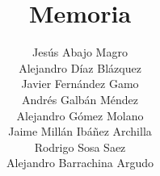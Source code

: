 

\documentclass[12pt]{article}
\usepackage[a4paper, margin=1in, headheight=14pt]{geometry}
\usepackage[utf8]{inputenc}
\usepackage[spanish]{babel}
\usepackage{tabularx}
\usepackage{graphicx}
\usepackage{float}
\usepackage{setspace}
\usepackage{anyfontsize}
\usepackage[toc,page]{appendix} %
\usepackage{hyperref}
\usepackage[table]{xcolor}
\usepackage{fancyhdr}
\usepackage{nameref}
\usepackage{datetime}
\usepackage{tikz}
\usepackage[11pt]{moresize}
\usepackage{enumerate}
\usepackage{etoolbox}


\usetikzlibrary{calc}
\newcommand\HRule{\rule{\textwidth}{1pt}}


\pagestyle{fancy}
\fancyhf{}
\fancyhead[RE,LO]{\nombredelproyecto}
\fancyfoot[CE,CO]{\leftmark}
\fancyfoot[LE,RO]{\thepage}

\renewcommand{\headrulewidth}{2pt}
\renewcommand{\footrulewidth}{1pt}



\newcommand{\nombredelproyecto}{\textbf{Memoria}}
\setcounter{secnumdepth}{4}
\makeatletter
\renewcommand{\paragraph}{\@startsection{paragraph}{4}{0ex}%
    {-3.25ex plus -1ex minus -0.2ex}%
    {1.5ex plus 0.2ex}%
    {\normalfont\normalsize\bfseries}}
\makeatother

\title{\nombredelproyecto} 
\author{Jesús Abajo Magro \\
Alejandro Díaz Blázquez \\
Javier Fernández Gamo \\
Andrés Galbán Méndez \\
Alejandro Gómez Molano \\
Jaime Millán Ibáñez Archilla \\
Rodrigo Sosa Saez \\
Alejandro Barrachina Argudo}


